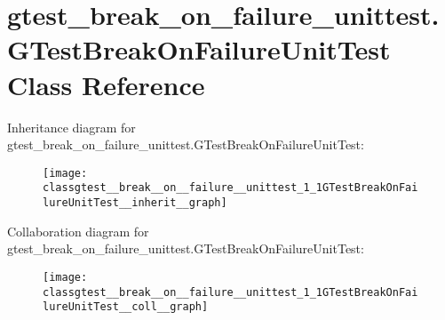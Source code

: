 \hypertarget{classgtest__break__on__failure__unittest_1_1GTestBreakOnFailureUnitTest}{}\section{gtest\+\_\+break\+\_\+on\+\_\+failure\+\_\+unittest.\+G\+Test\+Break\+On\+Failure\+Unit\+Test Class Reference}
\label{classgtest__break__on__failure__unittest_1_1GTestBreakOnFailureUnitTest}


Inheritance diagram for gtest\+\_\+break\+\_\+on\+\_\+failure\+\_\+unittest.\+G\+Test\+Break\+On\+Failure\+Unit\+Test\+:
\nopagebreak
\begin{figure}[H]
\begin{center}
\leavevmode
\texttt{[image: classgtest\_\_break\_\_on\_\_failure\_\_unittest\_1\_1GTestBreakOnFailureUnitTest\_\_inherit\_\_graph]}
\end{center}
\end{figure}


Collaboration diagram for gtest\+\_\+break\+\_\+on\+\_\+failure\+\_\+unittest.\+G\+Test\+Break\+On\+Failure\+Unit\+Test\+:
\nopagebreak
\begin{figure}[H]
\begin{center}
\leavevmode
\texttt{[image: classgtest\_\_break\_\_on\_\_failure\_\_unittest\_1\_1GTestBreakOnFailureUnitTest\_\_coll\_\_graph]}
\end{center}
\end{figure}

